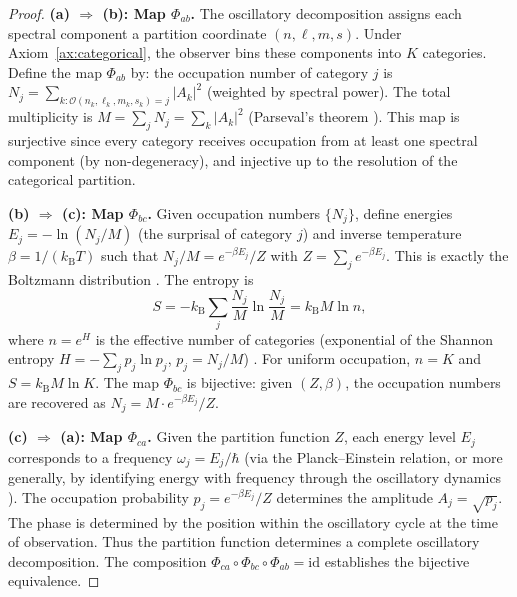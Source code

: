 \documentclass[11pt,twocolumn,a4paper]{article}
\newcommand{\kb}{k_{\mathrm{B}}}
\begin{document}
\begin{proof}
\textbf{(a) $\Rightarrow$ (b): Map $\Phi_{ab}$.}
The oscillatory decomposition assigns each spectral component a
partition coordinate $(n, \ell, m, s)$. Under
Axiom~\ref{ax:categorical}, the observer bins these components into
$K$ categories. Define the map $\Phi_{ab}$ by: the occupation number
of category $j$ is
$N_j = \sum_{k: \mathcal{O}(n_k, \ell_k, m_k, s_k) = j} |A_k|^2$
(weighted by spectral power). The total multiplicity is
$M = \sum_j N_j = \sum_k |A_k|^2$ (Parseval's theorem
\citep{fourier1822}). This map is surjective since every category
receives occupation from at least one spectral component (by
non-degeneracy), and injective up to the resolution of the categorical
partition.

\textbf{(b) $\Rightarrow$ (c): Map $\Phi_{bc}$.}
Given occupation numbers $\{N_j\}$, define energies $E_j = -\ln(N_j/M)$
(the surprisal of category $j$) and inverse temperature
$\beta = 1/(\kb T)$ such that $N_j/M = e^{-\beta E_j}/Z$ with
$Z = \sum_j e^{-\beta E_j}$. This is exactly the Boltzmann distribution
\citep{boltzmann1877}. The entropy is
\begin{equation}
\label{eq:entropy}
  S = -\kb \sum_j \frac{N_j}{M} \ln \frac{N_j}{M} = \kb M \ln n,
\end{equation}
where $n = e^{H}$ is the effective number of categories (exponential of
the Shannon entropy $H = -\sum_j p_j \ln p_j$, $p_j = N_j/M$)
\citep{shannon1948}. For uniform occupation, $n = K$ and $S = \kb M \ln K$.
The map $\Phi_{bc}$ is bijective: given $(Z, \beta)$, the occupation
numbers are recovered as $N_j = M \cdot e^{-\beta E_j}/Z$.

\textbf{(c) $\Rightarrow$ (a): Map $\Phi_{ca}$.}
Given the partition function $Z$, each energy level $E_j$ corresponds
to a frequency $\omega_j = E_j / \hbar$ (via the Planck--Einstein
relation, or more generally, by identifying energy with frequency
through the oscillatory dynamics \citep{einstein1905}). The occupation
probability $p_j = e^{-\beta E_j}/Z$ determines the amplitude
$A_j = \sqrt{p_j}$. The phase is determined by the position within the
oscillatory cycle at the time of observation. Thus the partition function
determines a complete oscillatory decomposition. The composition
$\Phi_{ca} \circ \Phi_{bc} \circ \Phi_{ab} = \mathrm{id}$ establishes
the bijective equivalence.
\end{proof}

\end{document}
